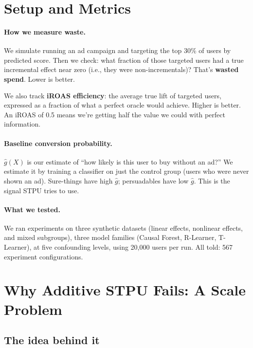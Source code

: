 \documentclass[10pt]{article}
\begin{document}
\section{Setup and Metrics}
\label{sec:background}

\paragraph{How we measure waste.}
We simulate running an ad campaign and targeting the top 30\% of users by
predicted score.  Then we check: what fraction of those targeted users had
a true incremental effect near zero (i.e., they were non-incrementals)?
That's \textbf{wasted spend}.  Lower is better.

We also track \textbf{iROAS efficiency}: the average true lift of targeted
users, expressed as a fraction of what a perfect oracle would achieve.
Higher is better. An iROAS of 0.5 means we're getting half the value we
could with perfect information.

\paragraph{Baseline conversion probability.}
$\hat{g}(X)$ is our estimate of ``how likely is this user to buy without
an ad?''  We estimate it by training a classifier on just the control group
(users who were never shown an ad).  Sure-things have high $\hat{g}$;
persuadables have low $\hat{g}$.  This is the signal STPU tries to use.

\paragraph{What we tested.}
We ran experiments on three synthetic datasets (linear effects, nonlinear
effects, and mixed subgroups), three model families (Causal Forest, R-Learner,
T-Learner), at five confounding levels, using 20,000 users per run.
All told: 567 experiment configurations.

\section{Why Additive STPU Fails: A Scale Problem}
\label{sec:failure}

\subsection{The idea behind it}
\end{document}

